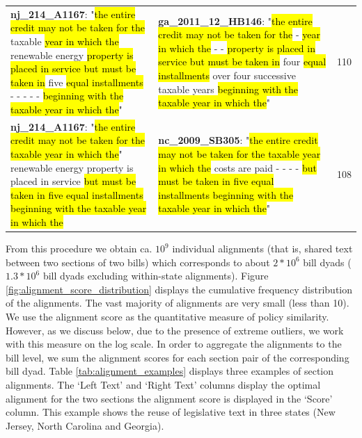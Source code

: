 \documentclass[12pt]{article} %
\begin{document}
\begin{table}[ht!]
\begin{tabular}{p{}|p{}|p{}}
\textbf{nj\_214\_A1167}: "\hl{the entire credit may not be taken for the} taxable \hl{year in which the} renewable energy \hl{property is placed in service but must be taken in} five \hl{equal installments} - - - - - \hl{beginning with the taxable year in which the}" & \textbf{ga\_2011\_12\_HB146}: "\hl{the entire credit may not be taken for the} - \hl{year in which the} - - \hl{property is placed in service but must be taken in} four \hl{equal installments} over four successive taxable years \hl{beginning with the taxable year in which the}" & 110 \\

\textbf{nj\_214\_A1167}: "\hl{the entire credit may not be taken for the taxable year in which the}" renewable energy property is placed in service \hl{but must be taken in five equal installments beginning with the taxable year in which the} & \textbf{nc\_2009\_SB305}: "\hl{the entire credit may not be taken for the taxable year in which the} costs are paid - - - - \hl{but must be taken in five equal installments beginning with the taxable year in which the}" & 108\\
\hline
\end{tabular}
\egroup
\end{table}

\clearpage

From this procedure we obtain ca. $10^9$ individual alignments (that is, shared
text between two sections of two bills) which corresponds to about $2 * 10^6$ bill dyads
($1.3 * 10^6$ bill dyads excluding within-state alignments). Figure
\ref{fig:alignment_score_distribution} displays the cumulative frequency
distribution of the alignments. The vast majority of alignments are very small
(less than 10). We use the alignment score as the quantitative measure of policy similarity. However, as we discuss below, due to the presence of extreme outliers, we work with this measure on the log scale. In order to aggregate the alignments to the bill level, we sum the alignment scores for each section pair of the corresponding bill dyad. Table \ref{tab:alignment_examples} displays three examples of section alignments. The `Left Text' and `Right Text' columns display the optimal alignment for the two sections the alignment score is displayed in the `Score' column. This example shows the reuse of legislative text in three states (New Jersey, North Carolina and Georgia).
\end{document}
